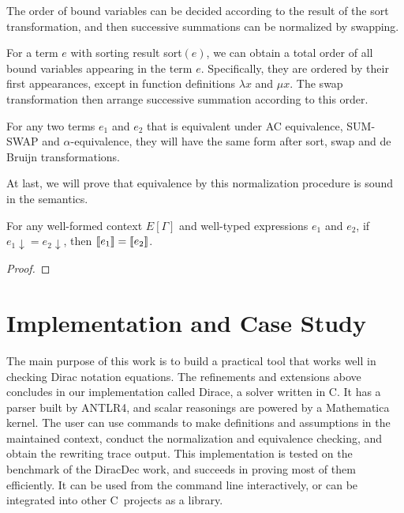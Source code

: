 \documentclass[runningheads]{llncs}
\newcommand{\CC}{C\nolinebreak\hspace{-.05em}\raisebox{.4ex}{\tiny\bf +}\nolinebreak\hspace{-.10em}\raisebox{.4ex}{\tiny\bf +}}
\def\CC{{C\nolinebreak[4]\hspace{-.05em}\raisebox{.4ex}{\tiny\bf ++}}}
\begin{document}
The order of bound variables can be decided according to the result of the sort transformation, and then successive summations can be normalized by swapping.
\begin{definition}
    For a term $e$ with sorting result sort$(e)$, we can obtain a total order of all bound variables appearing in the term $e$. Specifically, they are ordered by their first appearances, except in function definitions $\lambda x$ and $\mu x$.
    The swap transformation then arrange successive summation according to this order.
\end{definition}

\begin{lemma}
    For any two terms $e_1$ and $e_2$ that is equivalent under AC equivalence, SUM-SWAP and $\alpha$-equivalence, they will have the same form after sort, swap and de Bruijn transformations.
\end{lemma}






At last, we will prove that equivalence by this normalization procedure is sound in the semantics. 

\begin{theorem}[soundness]
    For any well-formed context $E[\Gamma]$ and well-typed expressions $e_1$ and $e_2$, if $e_1\downarrow = e_2\downarrow$, then ${\llbracket e_1 \rrbracket} = {\llbracket e_2 \rrbracket}$.
\end{theorem}
\begin{proof}
    
\end{proof}





\section{Implementation and Case Study}

The main purpose of this work is to build a practical tool that works well in checking Dirac notation equations. The refinements and extensions above concludes in our implementation called Dirace, a solver written in \CC. It has a parser built by ANTLR4, and scalar reasonings are powered by a Mathematica kernel. The user can use commands to make definitions and assumptions in the maintained context, conduct the normalization and equivalence checking, and obtain the rewriting trace output. This implementation 
is tested on the benchmark of the DiracDec work, and succeeds in proving most of them efficiently. 
It can be used from the command line interactively, or can be integrated into other \CC\ projects as a library.
\end{document}
